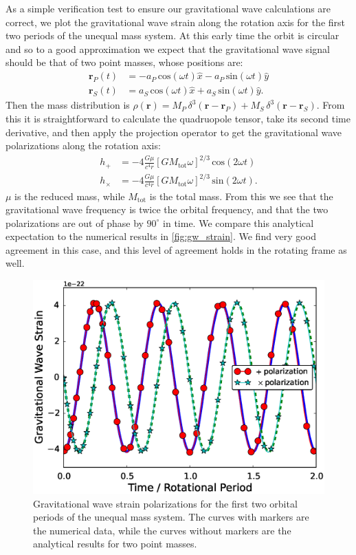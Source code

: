 \documentclass[iop]{../emulateapj}
\begin{document}
As a simple verification test to ensure our gravitational wave calculations are correct, we plot the 
gravitational wave strain along the rotation axis for the first two periods of the unequal mass system. 
At this early time the orbit is circular and so to a good approximation we expect that the gravitational 
wave signal should be that of two point masses, whose positions are:
\begin{align}
  \mathbf{r}_P(t) &= -a_P\, \text{cos}(\omega t) \hat{x} - a_P\, \text{sin}(\omega t) \hat{y} \\
  \mathbf{r}_S(t) &= a_S\, \text{cos}(\omega t) \hat{x} + a_S\, \text{sin}(\omega t) \hat{y}.
\end{align}
Then the mass distribution is $\rho(\mathbf{r}) = M_P\, \delta^3(\mathbf{r} - \mathbf{r}_P) + M_S\, \delta^3(\mathbf{r} - \mathbf{r}_S)$.
From this it is straightforward to calculate the quadruopole tensor, take its second time derivative, and then apply the 
projection operator to get the gravitational wave polarizations along the rotation axis:
\begin{align}
  h_+ &= -4\frac{G\mu}{c^4 r}\left[G M_{\text{tot}} \omega \right]^{2/3}\, \text{cos}(2\omega t) \\
  h_\times &= -4\frac{G\mu}{c^4 r}\left[G M_{\text{tot}} \omega \right]^{2/3}\, \text{sin}(2\omega t).
\end{align}
$\mu$ is the reduced mass, while $M_{\text{tot}}$ is the total mass. From this we see that the 
gravitational wave frequency is twice the orbital frequency, and that the two polarizations 
are out of phase by $90^\circ$ in time. We compare this analytical expectation to the 
numerical results in \autoref{fig:gw_strain}. We find very good agreement in this case, and this 
level of agreement holds in the rotating frame as well.

\begin{figure}
  \centering
  \includegraphics[scale=0.45]{plots/unequal_gw_rot0.eps}
  \caption{Gravitational wave strain polarizations for the first two orbital periods of the 
           unequal mass system. The curves with markers are the numerical data, while the 
           curves without markers are the analytical results for two point masses.\label{fig:gw_strain}}
\end{figure}
\end{document}
